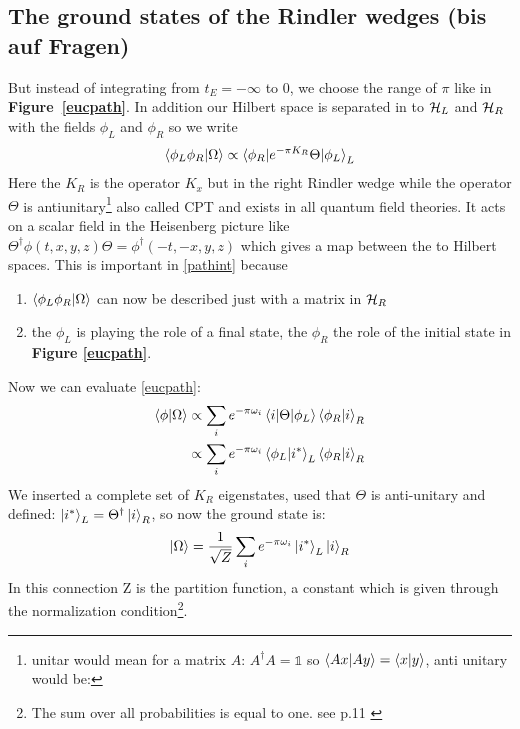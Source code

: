 	\subsection{The ground states of the Rindler wedges \checkmark (bis auf Fragen)}
	But instead of integrating from $t_E= -\infty$ to 0, we choose the range of $\pi$ like in \textbf{Figure~\ref{eucpath}}. In addition our Hilbert space is separated in to $\mathcal{H}_L$ and $\mathcal{H}_R$ with the fields $\phi_L$ and $\phi_R$ so we write 
	\begin{align} \label{pathint}
		\braket{\phi_L \phi_R | \Omega} \propto \braket{\phi_R| e^{-\pi K_R} \Theta| \phi_L}_L
	\end{align}
	Here the $K_R$ is the operator $K_x$ but in the right Rindler wedge while the operator $\Theta$ is antiunitary\footnote{unitar would mean for a matrix $A$: $A^\dagger A = \mathds{1}$ so $\braket{Ax|Ay}=\braket{x|y}$, anti unitary would be: } also called CPT and exists in all quantum field theories. It acts on a scalar field in the Heisenberg picture like $\Theta^\dagger \phi(t,x,y,z)\Theta = \phi^\dagger(-t,-x,y,z)$ which gives a map between the to Hilbert spaces. This is important in \eqref{pathint} because 
		\begin{enumerate}
			\item $\braket{\phi_L \phi_R| \Omega}$ can now be described just with a matrix in $\mathcal{H}_R$
			\item the $\phi_L$ is playing the role of a final state, the $\phi_R$ the role of the initial state in \textbf{Figure \ref{eucpath}}.
		\end{enumerate}
	Now we can evaluate \eqref{eucpath}:
	\begin{align}
		\braket{\phi|\Omega} &\propto \sum_i e^{-\pi \omega_i} \braket{i | \Theta | \phi_L} \braket{\phi_R|i}_R \nonumber\\
		&\propto \sum_i e^{-\pi \omega_i} \braket{\phi_L| i^*}_L\braket{\phi_R|i}_R
	\end{align} %
	We inserted a complete set of  $K_R$ eigenstates, used that $\Theta$ is anti-unitary and defined: $\ket{i^*}_L = \Theta^\dagger \ket{i}_R$, so now the ground state is:
	\begin{align}
		\ket{\Omega} = \frac{1}{\sqrt{Z}} \sum_i  e^{-\pi \omega_i} \ket{i^*}_L \ket{i}_R 
	\end{align}
	In this connection Z is the partition function, a constant which is given through the normalization condition\footnote{The sum over all probabilities is equal to one. see p.11 \cite{Brenig}}. 
	
